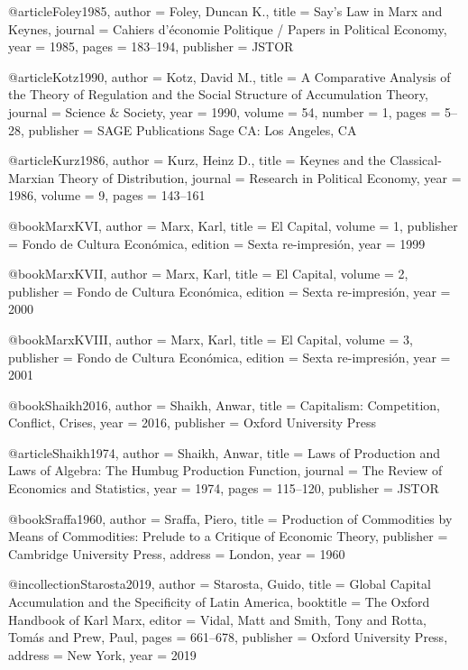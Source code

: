 @article{Foley1985,
	author  = {Foley, Duncan K.},
	title   = {Say's Law in Marx and Keynes},
	journal = {Cahiers d'{\'e}conomie Politique / Papers in Political Economy},
	year    = {1985},
	pages   = {183--194},
	publisher = {JSTOR}
}

@article{Kotz1990,
	author  = {Kotz, David M.},
	title   = {A Comparative Analysis of the Theory of Regulation and the Social Structure of Accumulation Theory},
	journal = {Science \& Society},
	year    = {1990},
	volume  = {54},
	number  = {1},
	pages   = {5--28},
	publisher = {SAGE Publications Sage CA: Los Angeles, CA}
}

@article{Kurz1986,
	author  = {Kurz, Heinz D.},
	title   = {Keynes and the Classical-Marxian Theory of Distribution},
	journal = {Research in Political Economy},
	year    = {1986},
	volume  = {9},
	pages   = {143--161}
}

@book{MarxKVI,
	author    = {Marx, Karl},
	title     = {El Capital},
	volume    = {1},
	publisher = {Fondo de Cultura Econ{\'o}mica},
	edition   = {Sexta re-impresi{\'o}n},
	year      = {1999}
}

@book{MarxKVII,
	author    = {Marx, Karl},
	title     = {El Capital},
	volume    = {2},
	publisher = {Fondo de Cultura Econ{\'o}mica},
	edition   = {Sexta re-impresi{\'o}n},
	year      = {2000}
}

@book{MarxKVIII,
	author    = {Marx, Karl},
	title     = {El Capital},
	volume    = {3},
	publisher = {Fondo de Cultura Econ{\'o}mica},
	edition   = {Sexta re-impresi{\'o}n},
	year      = {2001}
}

@book{Shaikh2016,
	author    = {Shaikh, Anwar},
	title     = {Capitalism: Competition, Conflict, Crises},
	year      = {2016},
	publisher = {Oxford University Press}
}

@article{Shaikh1974,
	author  = {Shaikh, Anwar},
	title   = {Laws of Production and Laws of Algebra: The Humbug Production Function},
	journal = {The Review of Economics and Statistics},
	year    = {1974},
	pages   = {115--120},
	publisher = {JSTOR}
}

@book{Sraffa1960,
	author    = {Sraffa, Piero},
	title     = {Production of Commodities by Means of Commodities: Prelude to a Critique of Economic Theory},
	publisher = {Cambridge University Press},
	address   = {London},
	year      = {1960}
}

@incollection{Starosta2019,
	author    = {Starosta, Guido},
	title     = {Global Capital Accumulation and the Specificity of Latin America},
	booktitle = {The Oxford Handbook of Karl Marx},
	editor    = {Vidal, Matt and Smith, Tony and Rotta, Tom{\'a}s and Prew, Paul},
	pages     = {661--678},
	publisher = {Oxford University Press},
	address   = {New York},
	year      = {2019}
}

